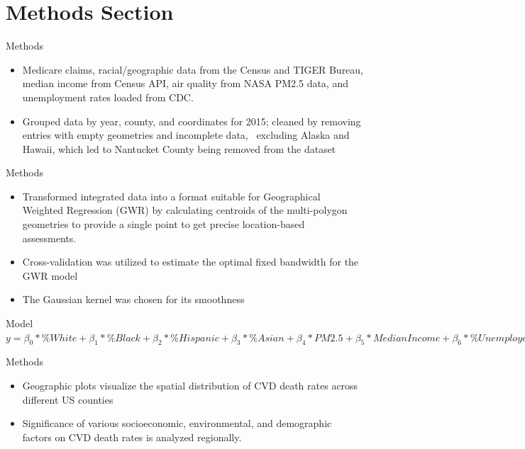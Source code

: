 \documentclass[
  ignorenonframetext,
]{beamer}
\begin{document}
\section{Methods Section}\label{methods-section}

\begin{frame}{Methods}
\label{methods}
\begin{itemize}
\item
  Medicare claims, racial/geographic data from the Census and TIGER
  Bureau, median income from Census API, air quality from NASA PM2.5
  data, and unemployment rates loaded from CDC.
\item
  Grouped data by year, county, and coordinates for 2015; cleaned by
  removing entries with empty geometries and incomplete data,~ excluding
  Alaska and Hawaii, which led to Nantucket County being removed from
  the dataset
\end{itemize}
\end{frame}

\begin{frame}{Methods}
\label{methods-1}
\begin{itemize}
\item
  Transformed integrated data into a format suitable for Geographical
  Weighted Regression (GWR) by calculating centroids of the
  multi-polygon geometries to provide a single point to get precise
  location-based assessments.~
\item
  Cross-validation was utilized to estimate the optimal fixed bandwidth
  for the GWR model
\item
  The Gaussian kernel was chosen for its smoothness
\end{itemize}
\end{frame}

\begin{frame}{Model}
\label{model}
\(y = \beta_0*\%White +\beta_1* \%Black + \beta_2 *\%Hispanic + \beta_3 *\%Asian + \beta_4 *PM2.5 + \beta_5 * Median Income + \beta_6 * \%Unemployed\)
\end{frame}

\begin{frame}{Methods}
\label{methods-2}
\begin{itemize}
\item
  Geographic plots visualize the spatial distribution of CVD death rates
  across different US counties
\item
  Significance of various socioeconomic, environmental, and demographic
  factors on CVD death rates is analyzed regionally.
\end{itemize}
\end{frame}
\end{document}
